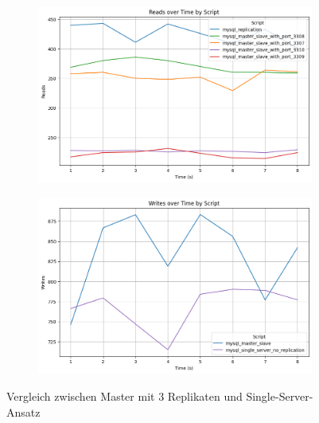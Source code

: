\vspace{-8pt}
\begin{figure}[H]
  \centering
  \begin{subfigure}[t]{0.48\textwidth}
    \centering
    \includegraphics[width=\textwidth]{PNGs/Script/Replication/replication-vs-no/Reads}
  \end{subfigure}
  \hfill
  \begin{subfigure}[t]{0.48\textwidth}
    \centering
    \includegraphics[width=\textwidth]{PNGs/Script/Replication/replication-vs-no/Writes}
  \end{subfigure}
  \vspace{-8pt}
  \caption[Replikation: Master-Replikat-Ansatz vs Single-Server]{Vergleich zwischen Master mit 3 Replikaten und Single-Server-Ansatz }
  \label{fig:replication-vs-no}
\end{figure}
\vspace{-20pt}

